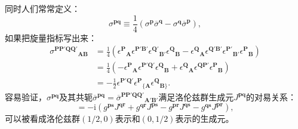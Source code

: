同时人们常常定义：
\begin{equation*}
	\sigma ^{\boldsymbol{pq}} \equiv \frac{1}{4} (\sigma ^{\boldsymbol{p}}\overline{\sigma }^{\boldsymbol{q}} -\sigma ^{\boldsymbol{q}}\overline{\sigma }^{\boldsymbol{p}} ),
\end{equation*}
如果把旋量指标写出来：
\begin{equation*}
	\begin{aligned}
		\sigma ^{\boldsymbol{PP} '\boldsymbol{QQ} '}{}_{\boldsymbol{AB}} & =\frac{1}{4} (\epsilon ^{\boldsymbol{P}}{}_{\boldsymbol{A}} \epsilon ^{\boldsymbol{P}'\boldsymbol{B} '} \epsilon ^{\boldsymbol{Q} '}{}_{\boldsymbol{B} '} \epsilon ^{\boldsymbol{Q}}{}_{\boldsymbol{B}} -\epsilon ^{\boldsymbol{Q}}{}_{\boldsymbol{A}} \epsilon ^{\boldsymbol{Q} '\boldsymbol{B} '} \epsilon ^{\boldsymbol{P} '}{}_{\boldsymbol{B} '} \epsilon ^{\boldsymbol{P}}{}_{\boldsymbol{B}} )\\
		& =\frac{1}{4} (-\epsilon ^{\boldsymbol{P}}{}_{\boldsymbol{A}} \epsilon ^{\boldsymbol{P}'\boldsymbol{Q}'} \epsilon ^{\boldsymbol{Q}}{}_{\boldsymbol{B}} +\epsilon ^{\boldsymbol{Q}}{}_{\boldsymbol{A}} \epsilon ^{\boldsymbol{QP} '} \epsilon ^{\boldsymbol{P}}{}_{\boldsymbol{B}} )\\
		& =-\frac{1}{2} \epsilon ^{\boldsymbol{P}'\boldsymbol{Q}'} \epsilon ^{\boldsymbol{P}}{}_{\{\boldsymbol{A}} \epsilon ^{\boldsymbol{Q}}{}_{\boldsymbol{B}\}} .
	\end{aligned}
\end{equation*}
容易验证，$\sigma ^{\boldsymbol{pq}}$及其共轭$\overline{\sigma }^{\boldsymbol{pq}} =\overline{\sigma }^{\boldsymbol{PP} '\boldsymbol{QQ} '}{}_{\boldsymbol{A} '\boldsymbol{B} '}$满足洛伦兹群生成元$J^{\boldsymbol{pq}}$的对易关系：
\begin{equation*}
	[J^{\boldsymbol{pq}} ,J^{\boldsymbol{rs}} ]=-\mathrm{i} (g^{\boldsymbol{ps}} J^{\boldsymbol{qr}} +g^{\boldsymbol{qr}} J^{\boldsymbol{ps}} -g^{\boldsymbol{pr}} J^{\boldsymbol{qs}} -g^{\boldsymbol{qs}} J^{\boldsymbol{pr}} ),
\end{equation*}
可以被看成洛伦兹群$( 1/2,0)$表示和$( 0,1/2)$表示的生成元。



